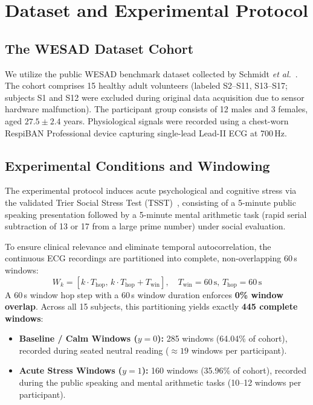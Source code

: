 \documentclass[conference]{IEEEtran}
\begin{document}
\section{Dataset and Experimental Protocol}
\label{sec:dataset}

\subsection{The WESAD Dataset Cohort}
We utilize the public WESAD benchmark dataset collected by Schmidt \textit{et al.}~\cite{schmidt2018wesad}. The cohort comprises 15 healthy adult volunteers (labeled S2--S11, S13--S17; subjects S1 and S12 were excluded during original data acquisition due to sensor hardware malfunction). The participant group consists of 12 males and 3 females, aged $27.5 \pm 2.4$ years. Physiological signals were recorded using a chest-worn RespiBAN Professional device capturing single-lead Lead-II ECG at 700\,Hz.

\subsection{Experimental Conditions and Windowing}
The experimental protocol induces acute psychological and cognitive stress via the validated Trier Social Stress Test (TSST)~\cite{kirschbaum1993trier}, consisting of a 5-minute public speaking presentation followed by a 5-minute mental arithmetic task (rapid serial subtraction of 13 or 17 from a large prime number) under social evaluation. 

To ensure clinical relevance and eliminate temporal autocorrelation, the continuous ECG recordings are partitioned into complete, non-overlapping 60\,s windows:
\begin{equation}
    W_k = [k \cdot T_{\text{hop}},\, k \cdot T_{\text{hop}} + T_{\text{win}}], \quad T_{\text{win}} = 60\,\text{s},\, T_{\text{hop}} = 60\,\text{s}
    \label{eq:windowing}
\end{equation}
A 60\,s window hop step with a 60\,s window duration enforces \textbf{0\% window overlap}. Across all 15 subjects, this partitioning yields exactly \textbf{445 complete windows}:
\begin{itemize}
    \item \textbf{Baseline / Calm Windows ($y = 0$):} 285 windows (64.04\% of cohort), recorded during seated neutral reading ($\approx 19$ windows per participant).
    \item \textbf{Acute Stress Windows ($y = 1$):} 160 windows (35.96\% of cohort), recorded during the public speaking and mental arithmetic tasks (10--12 windows per participant).
\end{itemize}
\end{document}
